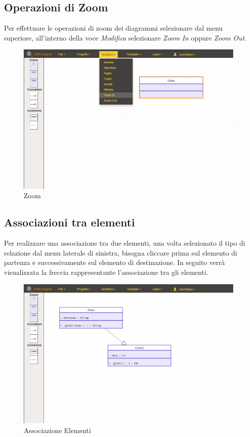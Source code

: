 \subsection{Operazioni di Zoom}
Per effettuare le operazioni di zoom dei diagrammi selezionare dal menu superiore, all'interno della voce \textit{Modifica} selezionare \textit{Zoom In} oppure \textit{Zoom Out}.\
\begin{figure}[H]
	\centering
		\includegraphics[width=1\linewidth]{res/img/zoom.png}
	\caption{Zoom}
\end{figure}
\newpage

\subsection{Associazioni tra elementi}
Per realizzare una associazione tra due elementi, una volta selezionato il tipo di relazione dal menu laterale di sinistra, bisogna cliccare prima sul elemento di partenza e successivamente sul elemento di destinazione. In seguito verrà visualizzata la freccia rappresentante l'associazione tra gli elementi.\\
\begin{figure}[H]
	\centering
		\includegraphics[width=1\linewidth]{res/img/associazioneElementi.png}
	\caption{Associazione Elementi}
\end{figure}